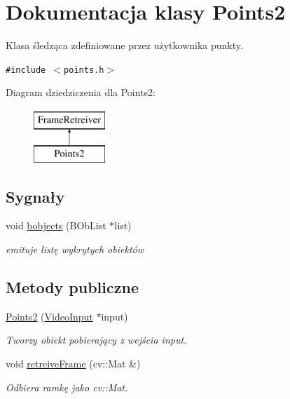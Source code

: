 \hypertarget{class_points2}{
\section{Dokumentacja klasy Points2}
\label{class_points2}
}
Klasa śledząca zdefiniowane przez użytkownika punkty.  


{\tt \#include $<$points.h$>$}

Diagram dziedziczenia dla Points2:\begin{figure}[H]
\begin{center}
\leavevmode
\includegraphics[height=2cm]{class_points2}
\end{center}
\end{figure}
\subsection*{Sygnały}
\begin{CompactItemize}
\item 
\hypertarget{class_points2_40606e5bff8ad0c1fc1887669d6e8e6e}{
void \hyperlink{class_points2_40606e5bff8ad0c1fc1887669d6e8e6e}{bobjects} (BObList $\ast$list)}
\label{class_points2_40606e5bff8ad0c1fc1887669d6e8e6e}

\begin{CompactList}\small\item\em emituje listę wykrytych obiektów \item\end{CompactList}\end{CompactItemize}
\subsection*{Metody publiczne}
\begin{CompactItemize}
\item 
\hypertarget{class_points2_8ae4636b6fcd263753884959bb7d9ede}{
\hyperlink{class_points2_8ae4636b6fcd263753884959bb7d9ede}{Points2} (\hyperlink{class_video_input}{VideoInput} $\ast$input)}
\label{class_points2_8ae4636b6fcd263753884959bb7d9ede}

\begin{CompactList}\small\item\em Tworzy obiekt pobierający z wejścia input. \item\end{CompactList}\item 
void \hyperlink{class_points2_f46dd0cd21f73b3214d5f766349b8450}{retreiveFrame} (cv::Mat \&)
\begin{CompactList}\small\item\em Odbiera ramkę jako cv::Mat. \item\end{CompactList}\end{CompactItemize}
